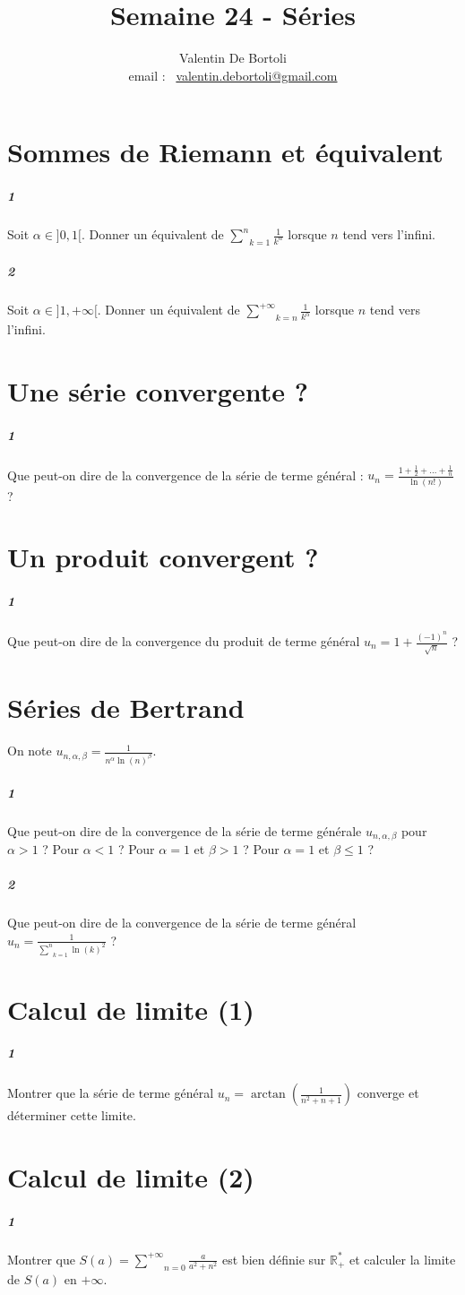 \documentclass[10pt,a4paper]{article}
\title{Semaine 24 - Séries}
\author{Valentin De Bortoli \\ email : \ \href{mailto:valentin.debortoli@gmail.com}{valentin.debortoli@gmail.com}}
\date{}
\begin{document}
\maketitle

\section{Sommes de Riemann et équivalent}
\subparagraph{1} Soit $\alpha \in ]0,1[$. Donner un équivalent de $\underset{k=1}{\overset{n}{\sum}} \frac{1}{k^{\alpha}}$ lorsque $n$ tend vers l'infini.
\subparagraph{2} Soit $\alpha \in ]1,+\infty[$. Donner un équivalent de $\underset{k=n}{\overset{+\infty}{\sum}} \frac{1}{k^{\alpha}}$ lorsque $n$ tend vers l'infini.

\section{Une série convergente ?}
\subparagraph{1}Que peut-on dire de la convergence de la série de terme général : $u_n = \frac{1+ \frac{1}{2}+ \dots + \frac{1}{n}}{\ln(n!)}$ ?

\section{Un produit convergent ?}
\subparagraph{1}Que peut-on dire de la convergence du produit de terme général $u_n = 1+ \frac{(-1)^n}{\sqrt{n}}$ ?

\section{Séries de Bertrand}
On note $u_{n,\alpha,\beta} = \frac{1}{n^{\alpha} \ln(n) ^{\beta}}$.
\subparagraph{1}Que peut-on dire de la convergence de la série de terme générale $u_{n, \alpha, \beta}$ pour $\alpha>1$ ? Pour $\alpha <1$ ? Pour $\alpha=1$ et $\beta>1$ ? Pour $\alpha=1$ et $\beta \le 1$ ?
\subparagraph{2}Que peut-on dire de la convergence de la série de terme général $u_n = \frac{1}{\underset{k=1}{\overset{n}{\sum}}\ln(k)^2}$ ?

\section{Calcul de limite (1)}
\subparagraph{1}Montrer que la série de terme général $u_n = \arctan \left( \frac{1}{n^2+n+1} \right)$ converge et déterminer cette limite.

\section{Calcul de limite (2)}
\subparagraph{1}Montrer que $S(a)=\underset{n=0}{\overset{+\infty}{\sum}} \frac{a}{a^2+n^2}$ est bien définie sur $\mathbb{R}_+^*$ et calculer la limite de $S(a)$ en $+\infty$.
\end{document}
